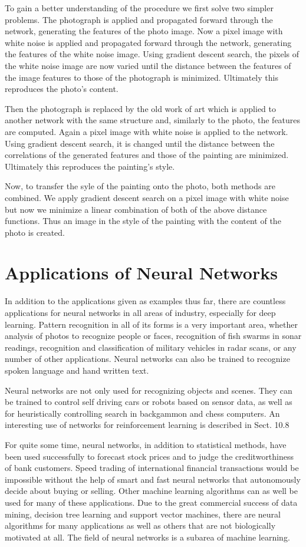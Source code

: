 \documentclass[10pt]{book}
\begin{document}
To gain a better understanding of the procedure we first solve two simpler problems. The photograph is applied and propagated forward through the network, generating the features of the photo image. Now a pixel image with white noise is applied and propagated forward through the network, generating the features of the white noise image. Using gradient descent search, the pixels of the white noise image are now varied until the distance between the features of the image features to those of the photograph is minimized. Ultimately this reproduces the photo’s content.

Then the photograph is replaced by the old work of art which is applied to another network with the same structure and, similarly to the photo, the features are computed. Again a pixel image with white noise is applied to the network. Using gradient descent search, it is changed until the distance between the correlations of the generated features and those of the painting are minimized. Ultimately this reproduces the painting’s style.

Now, to transfer the syle of the painting onto the photo, both methods are combined. We apply gradient descent search on a pixel image with white noise but now we minimize a linear combination of both of the above distance functions. Thus an image in the style of the painting with the content of the photo is created.

\section{Applications of Neural Networks}
In addition to the applications given as examples thus far, there are countless applications for neural networks in all areas of industry, especially for deep learning. Pattern recognition in all of its forms is a very important area, whether analysis of photos to recognize people or faces, recognition of fish swarms in sonar readings, recognition and classification of military vehicles in radar scans, or any number of other applications. Neural networks can also be trained to recognize spoken language and hand written text.

Neural networks are not only used for recognizing objects and scenes. They can be trained to control self driving cars or robots based on sensor data, as well as for heuristically controlling search in backgammon and chess computers. An interesting use of networks for reinforcement learning is described in Sect. 10.8

For quite some time, neural networks, in addition to statistical methods, have been used successfully to forecast stock prices and to judge the creditworthiness of bank customers. Speed trading of international financial transactions would be impossible without the help of smart and fast neural networks that autonomously decide about buying or selling.
Other machine learning algorithms can as well be used for many of these applications. Due to the great commercial success of data mining, decision tree learning and support vector machines, there are neural algorithms for many applications as well as others that are not biologically motivated at all. The field of neural networks is a subarea of machine learning.
\end{document}
